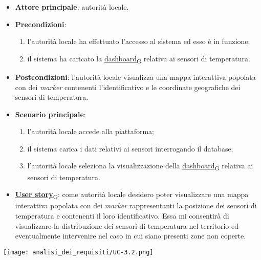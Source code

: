 \begin{itemize}
	\item \textbf{Attore principale}: autorità locale.
	\item \textbf{Precondizioni}:
	      \begin{enumerate}
		      \item l'autorità locale ha effettuato l'accesso al sistema ed esso è in funzione;
		      \item il sistema ha caricato la \href{https://7last.github.io/docs/pb/documentazione-interna/glossario\#dashboard}{dashboard\textsubscript{G}} relativa ai sensori di temperatura.
	      \end{enumerate}
	\item \textbf{Postcondizioni}: l'autorità locale visualizza una mappa interattiva popolata con dei \textit{marker} contenenti l'identificativo e le coordinate geografiche dei sensori di temperatura.
	\item \textbf{Scenario principale}:
	      \begin{enumerate}
		      \item l'autorità locale accede alla piattaforma;
		      \item il sistema carica i dati relativi ai sensori interrogando il database;
		      \item l'autorità locale seleziona la visualizzazione della \href{https://7last.github.io/docs/pb/documentazione-interna/glossario\#dashboard}{dashboard\textsubscript{G}} relativa ai sensori di temperatura.
	      \end{enumerate}
	\item \href{https://7last.github.io/docs/pb/documentazione-interna/glossario\#user-story}{\textbf{User story}\textsubscript{G}}:
	      come autorità locale desidero poter visualizzare una mappa interattiva popolata con dei \textit{marker} rappresentanti la posizione dei sensori di temperatura e contenenti il loro identificativo. Essa mi consentirà di visualizzare la distribuzione dei sensori di temperatura nel territorio ed eventualmente intervenire nel caso in cui siano presenti zone non coperte.
\end{itemize}
\begin{center}
	\texttt{[image: analisi\_dei\_requisiti/UC-3.2.png]}
\end{center}


